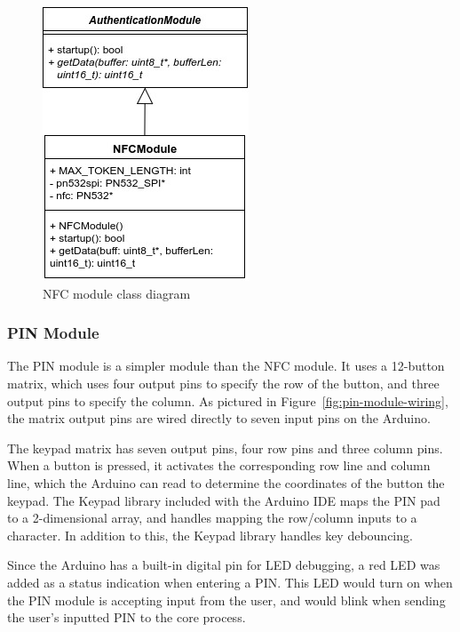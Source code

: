\documentclass[12pt]{report}
\let\Oldsubsubsection\subsubsection
\renewcommand{\subsubsection}{\FloatBarrier\Oldsubsubsection}
\begin{document}
\begin{figure}
    \centering
    \includegraphics{Diagrams/Hardware-Diagrams/nfc_module_class}
    \caption{NFC module class diagram}
    \label{fig:nfc-module-class}
\end{figure}

\subsubsection{PIN Module} \label{pin-modules}

The PIN module is a simpler module than the NFC module. It uses a 12-button matrix, which uses four output pins to 
specify the row of the button, and three output pins to specify the column. As pictured in 
Figure~\ref{fig:pin-module-wiring}, the matrix output pins are wired directly to seven input pins on the Arduino.

The keypad matrix has seven output pins, four row pins and three column pins. When a button is pressed, it activates 
the corresponding row line and column line, which the Arduino can read to determine the coordinates of the button the 
keypad. The Keypad library included with the Arduino IDE maps the PIN pad to a 2-dimensional array, and handles mapping 
the row/column inputs to a character. In addition to this, the Keypad library handles key debouncing.

Since the Arduino has a built-in digital pin for LED debugging, a red LED was added as a status indication when 
entering a PIN. This LED would turn on when the PIN module is accepting input from the user, and would blink when 
sending the user's inputted PIN to the core process.
\end{document}
